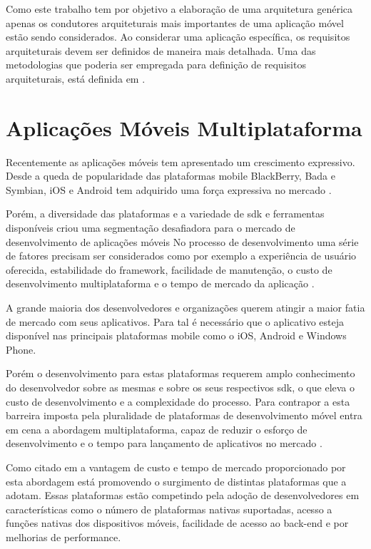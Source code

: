 \documentclass[
	article,			%
	11pt,				%
	oneside,			%
	a4paper,			%
	english,			%
	brazil,				%
	sumario=tradicional
]{abntex2}
\begin{document}
Como este trabalho tem por objetivo a elaboração de uma arquitetura genérica apenas os condutores arquiteturais mais importantes de uma aplicação móvel estão sendo considerados. Ao considerar uma aplicação específica, os requisitos arquiteturais devem ser definidos de maneira mais detalhada. Uma das metodologias que poderia ser empregada para definição de requisitos arquiteturais, está definida em \cite{eeles2005capturing}.

\section{Aplicações Móveis Multiplataforma}
Recentemente as aplicações móveis tem apresentado um crescimento expressivo. Desde a queda de popularidade das plataformas mobile BlackBerry, Bada e Symbian, iOS e Android tem adquirido uma força expressiva no mercado \cite{dalmasso2013survey}.

Porém, a diversidade das plataformas e a variedade de \gls{sdk} e ferramentas disponíveis criou uma segmentação desafiadora para o mercado de desenvolvimento de aplicações móveis No processo de desenvolvimento uma série de fatores precisam ser considerados como por exemplo a experiência de usuário oferecida, estabilidade do framework, facilidade de manutenção, o custo de desenvolvimento multiplataforma e o tempo de mercado da aplicação \cite{dalmasso2013survey}.

A grande maioria dos desenvolvedores e organizações querem atingir a maior fatia de mercado com seus aplicativos. Para tal é necessário que o aplicativo esteja disponível nas principais plataformas mobile como o iOS, Android e Windows Phone. 

Porém o desenvolvimento para estas plataformas requerem amplo conhecimento do desenvolvedor sobre as mesmas e sobre os seus respectivos \gls{sdk}, o que eleva o custo de desenvolvimento e a complexidade do processo. Para contrapor a esta barreira imposta pela pluralidade de plataformas de desenvolvimento móvel entra em cena a abordagem multiplataforma, capaz de reduzir o esforço de desenvolvimento e o tempo para lançamento de aplicativos no mercado \cite{dalmasso2013survey}.

Como citado em \cite{shehab2014reducing} a vantagem de custo e tempo de mercado proporcionado por esta abordagem está promovendo o surgimento de distintas plataformas que a adotam. Essas plataformas estão competindo pela adoção de desenvolvedores em características como o número de plataformas nativas suportadas, acesso a funções nativas dos dispositivos móveis, facilidade de acesso ao \gls{back-end} e por melhorias de performance. 
\end{document}
